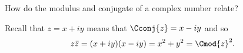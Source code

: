 

How do the modulus and conjugate of a complex number relate?


Recall that $z = x + iy$ means that $\Cconj{z} = x - iy$ and so
\[
  z\bar{z} = (x + iy)(x - iy) = x^2 + y^2 = \Cmod{z}^2.
\]

\blankpage
